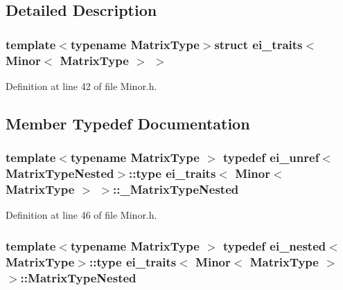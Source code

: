 \subsection{Detailed Description}
\subsubsection*{template$<$typename Matrix\-Type$>$struct ei\-\_\-traits$<$ Minor$<$ Matrix\-Type $>$ $>$}



Definition at line 42 of file Minor.\-h.



\subsection{Member Typedef Documentation}
\hypertarget{structei__traits_3_01_minor_3_01_matrix_type_01_4_01_4_abccddd6924fd4956137510a2c6a543bd}{
\subsubsection[{\-\_\-\-Matrix\-Type\-Nested}]{\setlength{\rightskip}{0pt plus 5cm}template$<$typename Matrix\-Type $>$ typedef {\bf ei\-\_\-unref}$<${\bf Matrix\-Type\-Nested}$>$\-::{\bf type} {\bf ei\-\_\-traits}$<$ {\bf Minor}$<$ Matrix\-Type $>$ $>$\-::{\bf \-\_\-\-Matrix\-Type\-Nested}}}\label{structei__traits_3_01_minor_3_01_matrix_type_01_4_01_4_abccddd6924fd4956137510a2c6a543bd}


Definition at line 46 of file Minor.\-h.

\hypertarget{structei__traits_3_01_minor_3_01_matrix_type_01_4_01_4_a9498bfb1b9a4e4ba9d00f93ffb825756}{
\subsubsection[{Matrix\-Type\-Nested}]{\setlength{\rightskip}{0pt plus 5cm}template$<$typename Matrix\-Type $>$ typedef {\bf ei\-\_\-nested}$<$Matrix\-Type$>$\-::{\bf type} {\bf ei\-\_\-traits}$<$ {\bf Minor}$<$ Matrix\-Type $>$ $>$\-::{\bf Matrix\-Type\-Nested}}}\label{structei__traits_3_01_minor_3_01_matrix_type_01_4_01_4_a9498bfb1b9a4e4ba9d00f93ffb825756}


